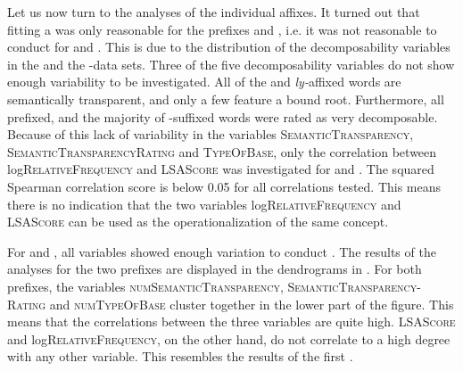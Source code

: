 
 Let us now turn to the analyses of the individual affixes.
 It turned out that fitting a  was only reasonable for the prefixes  and , i.e. it was not reasonable to conduct  for  and . 
 This is due to the distribution of the decomposability variables in the  and the -data sets. Three of the five decomposability variables do not show enough variability to be investigated. All of the  and \textit{ly-}affixed words are semantically transparent, and only a few feature a bound root. Furthermore, all prefixed, and the majority of -suffixed words were rated as very decomposable. Because of this lack of variability in the variables \textsc{SemanticTransparency}, \textsc{SemanticTransparencyRating} and \textsc{TypeOfBase}, only the correlation between log\textsc{RelativeFrequency} and \textsc{LSAScore} was investigated for  and .
 The squared Spearman correlation score is below 0.05 for all correlations tested. This means there is no indication that the two variables log\textsc{RelativeFrequency} and \textsc{LSAScore} can be used as the operationalization of the same concept.
 
 
 
 
 
 For  and , all variables showed enough variation to conduct . The results of the analyses for the two prefixes are displayed in the dendrograms in . 
 For both prefixes, the variables \textsc{numSemanticTransparency}, \textsc{SemanticTransparency-Rating} and \textsc{numTypeOfBase} cluster togeth\-er in the lower part of the figure. This means that the correlations between the three variables are quite high. \textsc{LSAScore} and log\textsc{RelativeFrequency}, on the other hand, do not correlate to a high degree with any other variable. This resembles the results of the first .

